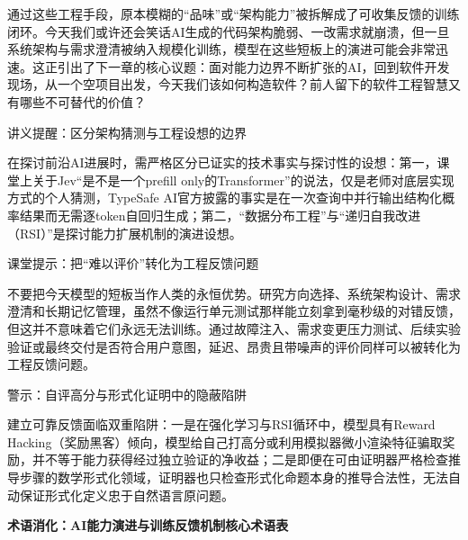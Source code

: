 \documentclass[UTF8,a4paper,11pt,fontset=fandol]{ctexart}
\begin{document}
通过这些工程手段，原本模糊的“品味”或“架构能力”被拆解成了可收集反馈的训练闭环。今天我们或许还会笑话AI生成的代码架构脆弱、一改需求就崩溃，但一旦系统架构与需求澄清被纳入规模化训练，模型在这些短板上的演进可能会非常迅速。这正引出了下一章的核心议题：面对能力边界不断扩张的AI，回到软件开发现场，从一个空项目出发，今天我们该如何构造软件？前人留下的软件工程智慧又有哪些不可替代的价值？

\begin{importantbox}{讲义提醒：区分架构猜测与工程设想的边界}

在探讨前沿AI进展时，需严格区分已证实的技术事实与探讨性的设想：第一，课堂上关于Jev“是不是一个prefill only的Transformer”的说法，仅是老师对底层实现方式的个人猜测，TypeSafe AI官方披露的事实是在一次查询中并行输出结构化概率结果而无需逐token自回归生成；第二，“数据分布工程”与“递归自我改进（RSI）”是探讨能力扩展机制的演进设想。

\end{importantbox}

\begin{knowledgebox}{课堂提示：把“难以评价”转化为工程反馈问题}

不要把今天模型的短板当作人类的永恒优势。研究方向选择、系统架构设计、需求澄清和长期记忆管理，虽然不像运行单元测试那样能立刻拿到毫秒级的对错反馈，但这并不意味着它们永远无法训练。通过故障注入、需求变更压力测试、后续实验验证或最终交付是否符合用户意图，延迟、昂贵且带噪声的评价同样可以被转化为工程反馈问题。

\end{knowledgebox}

\begin{warningbox}{警示：自评高分与形式化证明中的隐蔽陷阱}

建立可靠反馈面临双重陷阱：一是在强化学习与RSI循环中，模型具有Reward Hacking（奖励黑客）倾向，模型给自己打高分或利用模拟器微小渲染特征骗取奖励，并不等于能力获得经过独立验证的净收益；二是即便在可由证明器严格检查推导步骤的数学形式化领域，证明器也只检查形式化命题本身的推导合法性，无法自动保证形式化定义忠于自然语言原问题。

\end{warningbox}

\par{}\textbf{术语消化：AI能力演进与训练反馈机制核心术语表}
\end{document}
